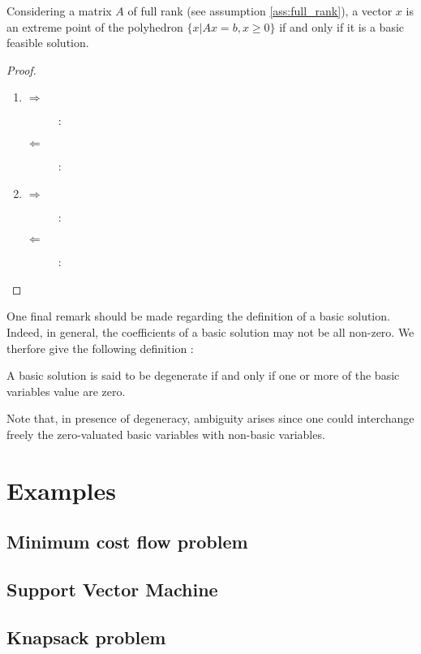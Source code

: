 \begin{theorem}
    Considering a matrix $A$ of full rank (see assumption \ref{ass:full_rank}), a vector $x$ is an extreme point of the polyhedron $\{x|Ax=b, x\ge 0\}$ if and only if it is a basic feasible solution.
\end{theorem}
\begin{proof}\leavevmode
    \begin{enumerate}[label=(\roman*)]
        \item
        \begin{description}
            \item[$\Rightarrow$] :
            \item[$\Leftarrow$] : 
        \end{description}
        \item
        \begin{description}
            \item[$\Rightarrow$] :
            \item[$\Leftarrow$] : 
        \end{description}
    \end{enumerate}
\end{proof}

One final remark should be made regarding the definition of a basic solution. Indeed, in general, the coefficients of a basic solution may not be all non-zero. We therfore give the following definition :
\begin{definition}
    A basic solution is said to be degenerate if and only if one or more of the basic variables value are zero.
\end{definition}
Note that, in presence of degeneracy, ambiguity arises since one could interchange freely the zero-valuated basic variables with non-basic variables.

\section{Examples}
\label{sec:lpb_examples}
\subsection{Minimum cost flow problem}
\subsection{Support Vector Machine}
\subsection{Knapsack problem}
